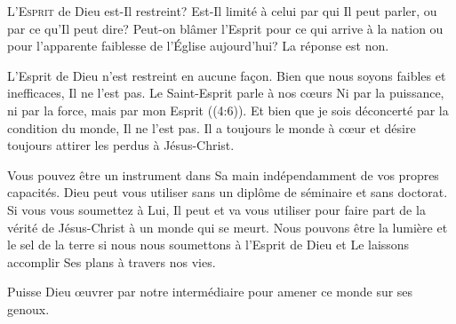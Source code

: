 


\lettrine{L}{'Esprit} de Dieu est-Il restreint?
 Est-Il limité à celui par qui Il peut parler, ou par ce qu'Il peut dire?
 Peut-on blâmer l'Esprit pour ce qui arrive à la nation
 ou pour l'apparente faiblesse de l'Église aujourd'hui? La réponse est non. 


L'Esprit de Dieu n'est restreint en aucune fa\c{c}on.
 Bien que nous soyons faibles et inefficaces, Il ne l'est pas.
 Le Saint-Esprit parle à nos c\oe{}urs\frcolon{} 
 \Og Ni par la puissance, ni par la force, mais par mon Esprit \Fg{}
 ((4:6)).
 Et bien que je sois déconcerté par la condition du monde, Il ne l'est pas.
 Il a toujours le monde à c\oe{}ur et désire toujours attirer
 les perdus à Jésus-Christ. 

Vous pouvez être un instrument dans Sa main indépendamment
 de vos propres capacités. Dieu peut vous utiliser sans un diplôme
 de séminaire et sans doctorat. Si vous vous soumettez à Lui,
 Il peut et va vous utiliser pour faire part de la vérité de Jésus-Christ
 à un monde qui se meurt. Nous pouvons être la lumière
 et le sel de la terre si nous nous soumettons à l'Esprit de Dieu
 et Le laissons accomplir Ses plans à travers nos vies. 

Puisse Dieu \oe{}uvrer par notre intermédiaire pour amener ce monde sur ses genoux.

\dvrule






